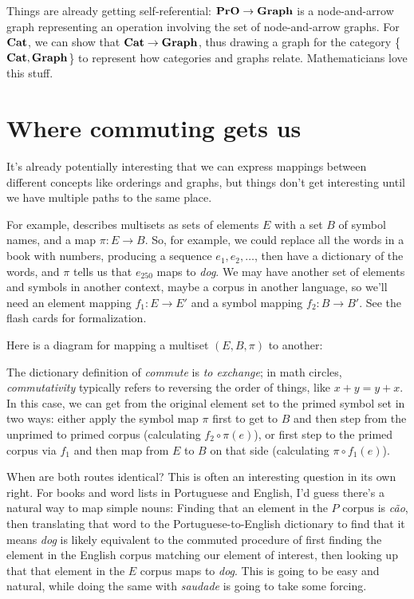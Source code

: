 \documentclass[11pt]{article}
\begin{document}
Things are already getting self-referential: ${\bf PrO}\to {\bf Graph}$ is a
node-and-arrow graph representing an operation involving the set of node-and-arrow
graphs. For ${\bf Cat}$, we can show that ${\bf Cat}\to {\bf Graph}$, thus drawing a
graph for the category \{${\bf Cat}, {\bf Graph}$\} to represent how categories and
graphs relate.  Mathematicians love this stuff.

\section{Where commuting gets us} It's already potentially interesting that we can
express mappings between different concepts like orderings and graphs, but things don't get
interesting until we have multiple paths to the same place.


For example,
\citet{spivak:category} describes multisets as sets of elements $E$ with a set $B$ of
symbol names, and a map $\pi:E\to B$. So, for example, we could replace all the words in a
book with numbers, producing a sequence $e_1, e_2, \dots$, then have a dictionary
of the words, and $\pi$ tells us that $e_{250}$ maps to {\em dog}. We
may have another set of elements and symbols in another context, maybe a corpus in
another language, so we'll need an element mapping $f_1:E\to E'$ and a symbol mapping
$f_2:B\to B'$. See the flash cards for formalization.

Here is a diagram for mapping a multiset $(E, B, \pi)$ to another:

The dictionary definition of {\em
commute} is {\em to exchange}; in math circles, {\em commutativity} typically refers to
reversing the order of things, like $x+y = y+x$. In this case, we can 
get from the original element set to the primed symbol set in two ways:
either apply the symbol map $\pi$ first to get to $B$ and then step from the unprimed to
primed corpus (calculating $f_2\circ\pi(e)$), or first step to the primed corpus via $f_1$ and then
map from $E$ to $B$ on that side (calculating $\pi\circ f_1(e)$).

When are both routes identical? This is often an interesting question in its own right.
For books and word lists in Portuguese and English, I'd guess there's a natural
way to map simple nouns: Finding that an element in the $P$ corpus is {\em cão},
then translating that word to the Portuguese-to-English dictionary to find that it means {\em dog}
is likely equivalent to the commuted procedure of first finding the element in the
English corpus matching our element of interest, then looking up that that element in
the $E$ corpus maps to {\em dog}. This is going to be easy and natural, while doing
the same with {\em saudade} is going to take some forcing.
\end{document}

